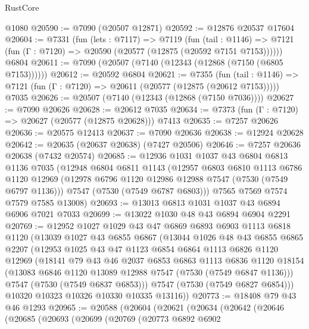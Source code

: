 \begin{lexlean}{RustCore}
\begin{coremodule}
    @1080
@20590 := @7090 (@20507 @12871)
@20592 := @12876 @20537 @17604
@20604 := @7331
    (fun (lets : @7117) =>
    @7119
      (fun (tail : @1146) =>
      @7121 (fun (Γ : @7120) => @20590 (@20577 (@12875 (@20592 @7151 @7153))))))
    @6804
@20611 := @7090 (@20507 (@7140 (@12343 (@12868 (@7150 (@6805 @7153))))))
@20612 := @20592 @6804
@20621 := @7355
    (fun (tail : @1146) => @7121 (fun (Γ : @7120) => @20611 (@20577 (@12875 (@20612 @7153)))))
    @7035
@20626 := @20507 (@7140 (@12343 (@12868 (@7150 @7036))))
@20627 := @7090 @20626
@20628 := @20612 @7035
@20634 := @7373 (fun (Γ : @7120) => @20627 (@20577 (@12875 @20628))) @7413
@20635 := @7257 @20626
@20636 := @20575 @12413
@20637 := @7090 @20636
@20638 := @12924 @20628
@20642 := @20635 (@20637 @20638) (@7427 @20506)
@20646 := @7257 @20636 @20638 (@7432 @20574)
@20685 := @12936
    @1031
    @1037
    @43
    @6804
    @6813
    @1136
    @7035
    (@12948
      @6804
      @6811
      @1143
      (@12957
        @6803
        @6810
        @1113
        @6786
        @1120
        @12969
        (@12978 @6796 @1120 @12986 @12988 @7547 (@7530 (@7549 @6797 @1136)))
        @7547
        (@7530 (@7549 @6787 @6803)))
      @7565
      @7569
      @7574
      @7579
      @7585
      @13008)
@20693 := @13013 @6813 @1031 @1037 @43 @6894 @6906 @7021 @7033
@20699 := @13022 @1030 @48 @43 @6894 @6904 @2291
@20769 := @12952
    @1027
    @1029
    @43
    @47
    @6869
    @6893
    @6903
    @1113
    @6818
    @1120
    (@13039
      @1027
      @43
      @6855
      @6867
      (@13044
        @1026
        @48
        @43
        @6855
        @6865
        @2207
        (@12953
          @1025
          @43
          @47
          @1123
          @6854
          @6864
          @1113
          @6826
          @1120
          @12969
          (@18141
            @79
            @43
            @46
            @2037
            @6853
            @6863
            @1113
            @6836
            @1120
            @18154
            (@13083 @6846 @1120 @13089 @12988 @7547 (@7530 (@7549 @6847 @1136)))
            @7547
            (@7530 (@7549 @6837 @6853)))
          @7547
          (@7530 (@7549 @6827 @6854)))
        @10320
        @10323
        @10326
        @10330
        @10335
        @13116))
@20773 := @18408 @79 @43 @46 @1293
@20965 := @20588
    (@20604
      (@20621
        (@20634
          (@20642
            (@20646
              (@20685
                (@20693
                  (@20699
                    (@20769
                      (@20773
                        @6892
                        @6902

\end{coremodule}
\end{lexlean}
